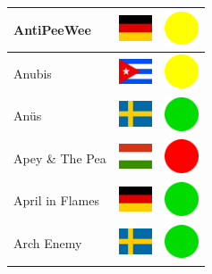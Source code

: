 \documentclass[12pt, a4paper, twoside]{report}
\begin{document}
\begin{center}
\begin{longtable}{|p{5cm}|p{2cm}|p{2cm}|}
AntiPeeWee & \includegraphics[width=1cm]{4x3/de} & \includegraphics[width=1cm]{likes/m} \\ \hline
Anubis & \includegraphics[width=1cm]{4x3/cu} & \includegraphics[width=1cm]{likes/m} \\ \hline
Anüs & \includegraphics[width=1cm]{4x3/se} & \includegraphics[width=1cm]{likes/y} \\ \hline
Apey \& The Pea & \includegraphics[width=1cm]{4x3/hu} & \includegraphics[width=1cm]{likes/n} \\ \hline
April in Flames & \includegraphics[width=1cm]{4x3/de} & \includegraphics[width=1cm]{likes/y} \\ \hline
Arch Enemy & \includegraphics[width=1cm]{4x3/se} & \includegraphics[width=1cm]{likes/y} \\ \hline

\end{longtable}
\end{center}
\end{document}
